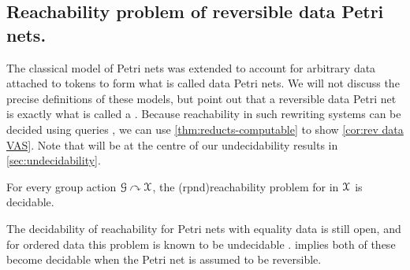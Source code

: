 
\subsection{Reachability problem of reversible data Petri nets.} The classical
model of Petri nets was extended to account for arbitrary data attached to
tokens to form what is called data Petri nets. We will not discuss the precise
definitions of these models, but point out that a reversible data Petri net is
exactly what is called a  \cite[Section
8]{GHOLAS24}. Because reachability in such rewriting systems can be decided
using  queries \cite[Theorem 64]{GHOLAS24}, we
can use \cref{thm:reducts-computable} to show
\cref{cor:rev data VAS}.
Note that  will be at the
centre of our undecidability results in \cref{sec:undecidability}.

\begin{theorem}[name={Reachability in Reversible Data Petri Nets},
  restate=cor:rev-data-VAS]
  \label{cor:rev data VAS}
  For every  group action $\mathcal{G}\curvearrowright\mathcal{X}$,
  the \intro(rpnd){reachability problem} for  in $\mathcal{X}$
  is decidable.
\end{theorem}
%
\begin{remark}
The decidability of reachability for Petri nets with equality data is still open,
and for ordered data this problem is known to be undecidable \cite[Proposition 1 and Section 5.2]{RODA11}.
 implies both of these become decidable when the Petri net is assumed to be reversible.
\end{remark}
%
